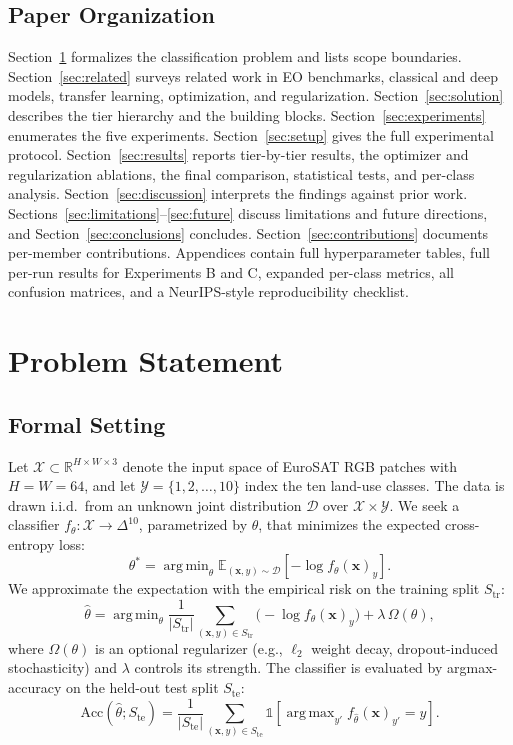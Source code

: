 \documentclass[10pt,letterpaper]{article}
\DeclareMathOperator*{\argmin}{arg\,min}
\DeclareMathOperator*{\argmax}{arg\,max}
\begin{document}
\subsection{Paper Organization}
Section~\ref{sec:problem} formalizes the classification problem and lists scope boundaries. Section~\ref{sec:related} surveys related work in EO benchmarks, classical and deep models, transfer learning, optimization, and regularization. Section~\ref{sec:solution} describes the tier hierarchy and the building blocks. Section~\ref{sec:experiments} enumerates the five experiments. Section~\ref{sec:setup} gives the full experimental protocol. Section~\ref{sec:results} reports tier-by-tier results, the optimizer and regularization ablations, the final comparison, statistical tests, and per-class analysis. Section~\ref{sec:discussion} interprets the findings against prior work. Sections~\ref{sec:limitations}--\ref{sec:future} discuss limitations and future directions, and Section~\ref{sec:conclusions} concludes. Section~\ref{sec:contributions} documents per-member contributions. Appendices contain full hyperparameter tables, full per-run results for Experiments B and C, expanded per-class metrics, all confusion matrices, and a NeurIPS-style reproducibility checklist.

\section{Problem Statement}
\label{sec:problem}

\subsection{Formal Setting}
Let $\mathcal{X} \subset \mathbb{R}^{H \times W \times 3}$ denote the input space of EuroSAT RGB patches with $H{=}W{=}64$, and let $\mathcal{Y} = \{1, 2, \ldots, 10\}$ index the ten land-use classes. The data is drawn i.i.d.\ from an unknown joint distribution $\mathcal{D}$ over $\mathcal{X} \times \mathcal{Y}$. We seek a classifier $f_\theta : \mathcal{X} \rightarrow \Delta^{10}$, parametrized by $\theta$, that minimizes the expected cross-entropy loss:
\begin{equation}
\theta^\ast = \argmin_\theta \mathbb{E}_{(\mathbf{x}, y) \sim \mathcal{D}} \left[ -\log f_\theta(\mathbf{x})_y \right].
\end{equation}
We approximate the expectation with the empirical risk on the training split $S_\text{tr}$:
\begin{equation}
\hat{\theta} = \argmin_\theta \frac{1}{|S_\text{tr}|} \sum_{(\mathbf{x}, y) \in S_\text{tr}} \big( -\log f_\theta(\mathbf{x})_y \big) + \lambda \, \Omega(\theta),
\end{equation}
where $\Omega(\theta)$ is an optional regularizer (e.g., $\ell_2$ weight decay, dropout-induced stochasticity) and $\lambda$ controls its strength. The classifier is evaluated by argmax-accuracy on the held-out test split $S_\text{te}$:
\begin{equation}
\text{Acc}(\hat{\theta}; S_\text{te}) = \frac{1}{|S_\text{te}|} \sum_{(\mathbf{x}, y) \in S_\text{te}} \mathbb{1}\!\left[ \argmax_{y'} f_{\hat\theta}(\mathbf{x})_{y'} = y \right].
\end{equation}
\end{document}
